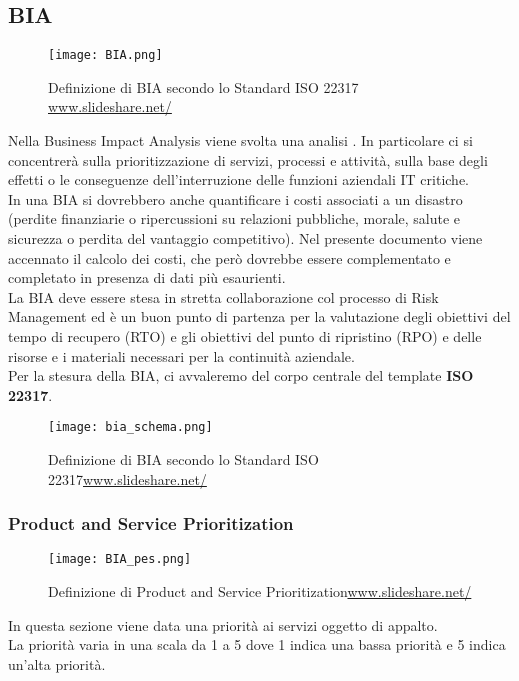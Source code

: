 \newpage
\subsection{BIA}
\label{bia}
\begin{figure}[H]
\centering
\texttt{[image: BIA.png]}
\caption{Definizione di BIA secondo lo Standard ISO 22317 \href{https://www.slideshare.net/TheBCEye/isos-newest-standard-the-bia-iso-22317}{www.slideshare.net/}}
\end{figure}

Nella Business Impact Analysis viene svolta una analisi . In particolare ci si concentrerà sulla prioritizzazione di servizi, processi e attività, sulla base degli effetti o le conseguenze dell'interruzione delle funzioni aziendali IT critiche.
\\In una BIA si dovrebbero anche quantificare i costi associati a un disastro (perdite finanziarie o ripercussioni su relazioni pubbliche, morale, salute e sicurezza o perdita del vantaggio competitivo). Nel presente documento viene accennato il calcolo dei costi, che però dovrebbe essere complementato e completato in presenza di dati più esaurienti.
\\ La BIA deve essere stesa in stretta collaborazione col processo di Risk Management ed è un buon punto di partenza per la valutazione degli obiettivi del tempo di recupero (RTO) e gli obiettivi del punto di ripristino (RPO) e delle risorse e i materiali necessari per la continuità aziendale.
\vspace{0.5cm}
\\ Per la stesura della BIA, ci avvaleremo del corpo centrale del template \textbf{ISO 22317}.
\vspace{0.5cm}
\begin{figure}[H]
\centering
\texttt{[image: bia\_schema.png]}
\caption{Definizione di BIA secondo lo Standard ISO 22317\href{https://www.slideshare.net/TheBCEye/isos-newest-standard-the-bia-iso-22317}{www.slideshare.net/}}
\end{figure}

\newpage
\subsubsection{Product and Service Prioritization}
\begin{figure}[H]
\centering
\texttt{[image: BIA\_pes.png]}
\caption{Definizione di Product and Service Prioritization\href{https://www.slideshare.net/TheBCEye/isos-newest-standard-the-bia-iso-22317}{www.slideshare.net/}}
\end{figure}
In questa sezione viene data una priorità ai servizi oggetto di appalto.\\
La priorità varia in una scala da 1 a 5 dove 1 indica una bassa priorità e 5 indica un'alta priorità.


